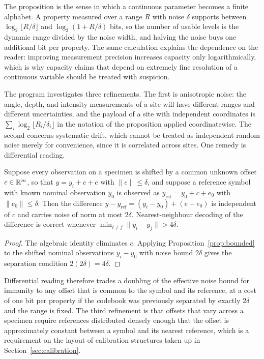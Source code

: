 The proposition is the sense in which a continuous parameter becomes a finite alphabet. A property measured over a range $R$ with noise $\delta$ supports between $\log_2\lfloor R/\delta\rfloor$ and $\log_2(1+R/\delta)$ bits, so the number of usable levels is the dynamic range divided by the noise width, and halving the noise buys one additional bit per property. The same calculation explains the dependence on the reader: improving measurement precision increases capacity only logarithmically, which is why capacity claims that depend on extremely fine resolution of a continuous variable should be treated with suspicion.

The program investigates three refinements. The first is anisotropic noise: the angle, depth, and intensity measurements of a site will have different ranges and different uncertainties, and the payload of a site with independent coordinates is $\sum_i\log_2\lfloor R_i/\delta_i\rfloor$ in the notation of the proposition applied coordinatewise. The second concerns systematic drift, which cannot be treated as independent random noise merely for convenience, since it is correlated across sites. One remedy is differential reading.

\begin{proposition}\label{prop:diff}
Suppose every observation on a specimen is shifted by a common unknown offset $c\in\mathbb{R}^m$, so that $y=y_i+c+e$ with $\|e\|\le\delta$, and suppose a reference symbol with known nominal observation $y_0$ is observed as $y_{\mathrm{ref}}=y_0+c+e_0$ with $\|e_0\|\le\delta$. Then the difference $y-y_{\mathrm{ref}}=(y_i-y_0)+(e-e_0)$ is independent of $c$ and carries noise of norm at most $2\delta$. Nearest-neighbour decoding of the difference is correct whenever $\min_{i\ne j}\|y_i-y_j\|>4\delta$.
\end{proposition}

\begin{proof}
The algebraic identity eliminates $c$. Applying Proposition~\ref{prop:bounded} to the shifted nominal observations $y_i-y_0$ with noise bound $2\delta$ gives the separation condition $2(2\delta)=4\delta$.
\end{proof}

Differential reading therefore trades a doubling of the effective noise bound for immunity to any offset that is common to the symbol and its reference, at a cost of one bit per property if the codebook was previously separated by exactly $2\delta$ and the range is fixed. The third refinement is that offsets that vary across a specimen require references distributed densely enough that the offset is approximately constant between a symbol and its nearest reference, which is a requirement on the layout of calibration structures taken up in Section~\ref{sec:calibration}.

